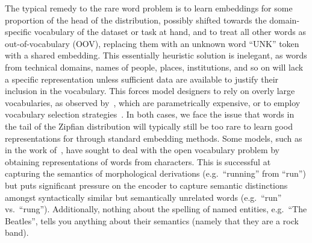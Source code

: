 The typical remedy to the rare word problem is to learn embeddings for some proportion of the head of the distribution, possibly shifted towards the domain-specific vocabulary of the dataset or task at hand, and to treat all other words as out-of-vocabulary (OOV), replacing them with an unknown word ``UNK'' token with a shared embedding. This essentially heuristic solution is inelegant, as words from technical domains, names of people, places, institutions, and so on will lack a specific representation unless sufficient data are available to justify their inclusion in the vocabulary. This forces model designers to rely on overly large vocabularies, as observed by~\citep{mi2016vocabulary,sennrich2015neural}, which are parametrically expensive, or to employ vocabulary selection strategies~\citep{lvocabulary}. In both cases, we face the issue that words in the tail of the Zipfian distribution will typically still be too rare to learn good representations for through standard embedding methods. Some models, such as in the work of~\cite{ling2015finding}, have sought to deal with the open vocabulary problem by obtaining representations of words from characters. This is successful at capturing the semantics of morphological derivations (e.g.~``running'' from ``run'') but puts significant pressure on the encoder to capture semantic distinctions amongst syntactically similar but semantically unrelated words (e.g.~``run'' vs.~``rung''). Additionally, nothing about the spelling of named entities, e.g.~``The Beatles'', tells you anything about their semantics (namely that they are a rock band).



